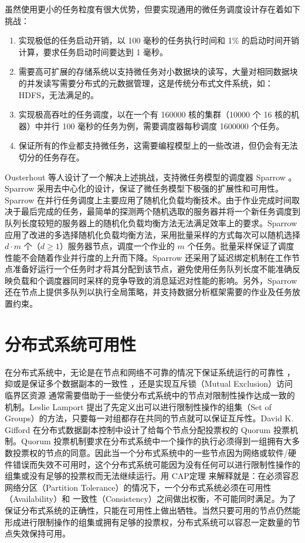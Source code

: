 虽然使用更小的任务粒度有很大优势，但要实现通用的微任务调度设计存在着如下挑战：
\begin{enumerate}
\item 实现极低的任务启动开销，以 100 毫秒的任务执行时间和 1\% 的启动时间开销计算，要求任务启动时间要达到 1 毫秒。
\item 需要高可扩展的存储系统以支持微任务对小数据块的读写，大量对相同数据块的并发读写需要分布式的元数据管理，这是传统分布式文件系统，如：HDFS，无法满足的。
\item 实现极高吞吐的任务调度，以在一个有 160000 核的集群（10000 个 16 核的机器）中并行 100 毫秒的任务为例，需要调度器每秒调度 1600000 个任务。
\item 保证所有的作业都支持微任务，这需要编程模型上的一些改进，但仍会有无法切分的任务存在。
\end{enumerate}

Ousterhout 等人设计了一个解决上述挑战，支持微任务模型的调度器 Sparrow \cite{Ousterhout:2013:SDL:2517349.2522716}。Sparrow 采用去中心化的设计，保证了微任务模型下极强的扩展性和可用性。Sparrow 在并行任务调度上主要应用了随机化负载均衡技术。由于作业完成时间取决于最后完成的任务，最简单的探测两个随机选取的服务器并将一个新任务调度到队列长度较短的服务器上的随机化负载均衡方法无法满足效率上的要求。Sparrow 应用了改进的多选择随机化负载均衡方法，采用批量采样的方式每次可以随机选择 $d \cdot m$ 个（$d \geq 1$）服务器节点，调度一个作业的 $m$ 个任务。批量采样保证了调度性能不会随着作业并行度的上升而下降。Sparrow 还采用了延迟绑定机制在工作节点准备好运行一个任务时才将其分配到该节点，避免使用任务队列长度不能准确反映负载和个调度器同时采样的竞争导致的消息延迟对性能的影响。另外，Sparrow 还在节点上提供多队列以执行全局策略，并支持数据分析框架需要的作业及任务放置约束。

\section{分布式系统可用性}
在分布式系统中，无论是在节点和网络不可靠的情况下保证系统运行的可靠性 \cite{Lamport197895}，抑或是保证多个数据副本的一致性 \cite{Gifford:1979:WVR:800215.806583}，还是实现互斥锁（Mutual Exclusion）访问临界区资源 \cite{Garcia-Molina:1985:AVD:4221.4223} 通常需要借助于一些使分布式系统中的节点对限制性操作达成一致的机制。Leslie Lamport \cite{Lamport197895} 提出了先定义出可以进行限制性操作的组集（Set of Groups）的方法，只要每一对组都存在共同的节点就可以保证互斥性。David K. Gifford \cite{Gifford:1979:WVR:800215.806583} 在分布式数据副本控制中设计了给每个节点分配投票权的 Quorum 投票机制。Quorum 投票机制要求在分布式系统中一个操作的执行必须得到一组拥有大多数投票权的节点的同意。因此当一个分布式系统中的一些节点因为网络或软件/硬件错误而失效不可用时，这个分布式系统可能因为没有任何可以进行限制性操作的组集或没有足够的投票权而无法继续运行。用 CAP定理 \cite{Fox:1999:HYS:822076.822436} 来解释就是：在必须容忍网络分区（Partition Tolerance）的情况下，一个分布式系统必须在可用性（Availability）和 一致性（Consistency）之间做出权衡，不可能同时满足。为了保证分布式系统的正确性，只能在可用性上做出牺牲。当然只要可用的节点仍然能形成进行限制操作的组集或拥有足够的投票权，分布式系统可以容忍一定数量的节点失效保持可用。

